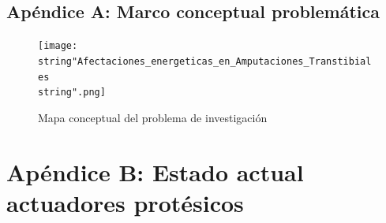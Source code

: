 \documentclass[12pt,english]{article}
\begin{document}
\newpage

\appendix
\newpage
\begin{landscape}
\section*{\label{sec:Ap=0000E9ndice-C}Apéndice A: Marco conceptual problemática}

\begin{figure}[H]
\begin{centering}
\texttt{[image: \\string"Afectaciones\_energeticas\_en\_Amputaciones\_Transtibiales\\string".png]}
\par\end{centering}

\centering{}\caption{Mapa conceptual del problema de investigación}
\end{figure}


\end{landscape}

\section*{\label{sec:Ap=0000E9ndice-B:}Apéndice B: Estado actual actuadores
protésicos}
\end{document}
